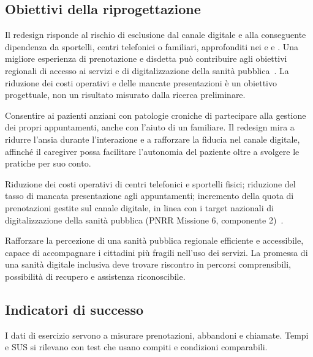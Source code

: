 \subsection{Obiettivi della riprogettazione}


Il redesign risponde al rischio di esclusione dal canale digitale e alla
conseguente dipendenza da sportelli, centri telefonici o familiari, approfonditi
nei  e  e . Una migliore esperienza di prenotazione e disdetta
può contribuire agli obiettivi regionali di accesso ai servizi e di
digitalizzazione della sanità pubblica~\cite{rerTempiAttesa,pnrrM6}.
La riduzione dei costi operativi e delle mancate presentazioni è un obiettivo
progettuale, non un risultato misurato dalla ricerca preliminare.


Consentire ai pazienti anziani con patologie croniche di partecipare alla
gestione dei propri appuntamenti, anche con l'aiuto di un familiare. Il
redesign mira a ridurre l'ansia durante l'interazione e a rafforzare la
fiducia nel canale digitale, affinché il caregiver possa facilitare
l'autonomia del paziente oltre a svolgere le pratiche per suo conto.


Riduzione dei costi operativi di centri telefonici e sportelli fisici;
riduzione del tasso di mancata presentazione agli appuntamenti;
incremento della quota di prenotazioni gestite sul canale digitale, in
linea con i target nazionali di digitalizzazione della sanità pubblica
(PNRR Missione 6, componente 2)~\cite{pnrrM6}.


Rafforzare la percezione di una sanità pubblica regionale efficiente e
accessibile, capace di accompagnare i cittadini più fragili nell'uso dei
servizi. La promessa di una sanità digitale inclusiva deve trovare
riscontro in percorsi comprensibili, possibilità di recupero e assistenza
riconoscibile.

\subsection{Indicatori di successo}

I dati di esercizio servono a misurare prenotazioni, abbandoni e chiamate.
Tempi e SUS si rilevano con test che usano compiti e condizioni comparabili.


